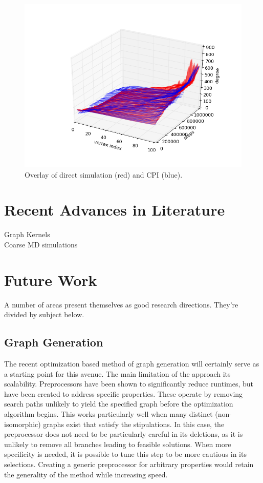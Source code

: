\documentclass[11pt]{article}
\begin{document}
\begin{figure}[h!]
  \centering
  \includegraphics[width=1.0\linewidth]{paCPI}
  \caption{Overlay of direct simulation (red) and CPI (blue).}
  \label{fig:paCPI}
\end{figure}

\section{Recent Advances in Literature}
Graph Kernels\\
Coarse MD simulations\\
\section{Future Work}
A number of areas present themselves as good research directions. They're divided by subject below.
\subsection{Graph Generation}
The recent optimization based method of graph generation will certainly serve as a starting point for this avenue. The main limitation of the approach its scalability. Preprocessors have been shown to significantly reduce runtimes, but have been created to address specific properties. These operate by removing search paths unlikely to yield the specified graph before the optimization algorithm begins. This works particularly well when many distinct (non-isomorphic) graphs exist that satisfy the stipulations. In this case, the preprocessor does not need to be particularly careful in its deletions, as it is unlikely to remove all branches leading to feasible solutions. When more specificity is needed, it is possible to tune this step to be more cautious in its selections. Creating a generic preprocessor for arbitrary properties would retain the generality of the method while increasing speed. \\
\end{document}
